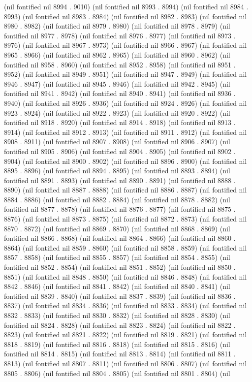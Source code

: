 {{(nil fontified nil 8994 . 9010) (nil fontified nil 8993 . 8994) (nil fontified nil 8984 . 8993) (nil fontified nil 8983 . 8984) (nil fontified nil 8982 . 8983) (nil fontified nil 8980 . 8982) (nil fontified nil 8979 . 8980) (nil fontified nil 8978 . 8979) (nil fontified nil 8977 . 8978) (nil fontified nil 8976 . 8977) (nil fontified nil 8973 . 8976) (nil fontified nil 8967 . 8973) (nil fontified nil 8966 . 8967) (nil fontified nil 8965 . 8966) (nil fontified nil 8962 . 8965) (nil fontified nil 8960 . 8962) (nil fontified nil 8958 . 8960) (nil fontified nil 8952 . 8958) (nil fontified nil 8951 . 8952) (nil fontified nil 8949 . 8951) (nil fontified nil 8947 . 8949) (nil fontified nil 8946 . 8947) (nil fontified nil 8945 . 8946) (nil fontified nil 8942 . 8945) (nil fontified nil 8941 . 8942) (nil fontified nil 8940 . 8941) (nil fontified nil 8936 . 8940) (nil fontified nil 8926 . 8936) (nil fontified nil 8924 . 8926) (nil fontified nil 8923 . 8924) (nil fontified nil 8922 . 8923) (nil fontified nil 8920 . 8922) (nil fontified nil 8918 . 8920) (nil fontified nil 8914 . 8918) (nil fontified nil 8913 . 8914) (nil fontified nil 8912 . 8913) (nil fontified nil 8911 . 8912) (nil fontified nil 8908 . 8911) (nil fontified nil 8907 . 8908) (nil fontified nil 8906 . 8907) (nil fontified nil 8905 . 8906) (nil fontified nil 8904 . 8905) (nil fontified nil 8902 . 8904) (nil fontified nil 8900 . 8902) (nil fontified nil 8896 . 8900) (nil fontified nil 8895 . 8896) (nil fontified nil 8894 . 8895) (nil fontified nil 8893 . 8894) (nil fontified nil 8891 . 8893) (nil fontified nil 8890 . 8891) (nil fontified nil 8888 . 8890) (nil fontified nil 8887 . 8888) (nil fontified nil 8886 . 8887) (nil fontified nil 8884 . 8886) (nil fontified nil 8882 . 8884) (nil fontified nil 8878 . 8882) (nil fontified nil 8877 . 8878) (nil fontified nil 8876 . 8877) (nil fontified nil 8875 . 8876) (nil fontified nil 8873 . 8875) (nil fontified nil 8872 . 8873) (nil fontified nil 8870 . 8872) (nil fontified nil 8869 . 8870) (nil fontified nil 8868 . 8869) (nil fontified nil 8866 . 8868) (nil fontified nil 8864 . 8866) (nil fontified nil 8860 . 8864) (nil fontified nil 8859 . 8860) (nil fontified nil 8858 . 8859) (nil fontified nil 8857 . 8858) (nil fontified nil 8855 . 8857) (nil fontified nil 8854 . 8855) (nil fontified nil 8852 . 8854) (nil fontified nil 8851 . 8852) (nil fontified nil 8850 . 8851) (nil fontified nil 8848 . 8850) (nil fontified nil 8846 . 8848) (nil fontified nil 8842 . 8846) (nil fontified nil 8841 . 8842) (nil fontified nil 8840 . 8841) (nil fontified nil 8839 . 8840) (nil fontified nil 8837 . 8839) (nil fontified nil 8836 . 8837) (nil fontified nil 8834 . 8836) (nil fontified nil 8833 . 8834) (nil fontified nil 8832 . 8833) (nil fontified nil 8830 . 8832) (nil fontified nil 8828 . 8830) (nil fontified nil 8824 . 8828) (nil fontified nil 8823 . 8824) (nil fontified nil 8822 . 8823) (nil fontified nil 8821 . 8822) (nil fontified nil 8819 . 8821) (nil fontified nil 8818 . 8819) (nil fontified nil 8816 . 8818) (nil fontified nil 8815 . 8816) (nil fontified nil 8814 . 8815) (nil fontified nil 8813 . 8814) (nil fontified nil 8811 . 8813) (nil fontified nil 8807 . 8811) (nil fontified nil 8806 . 8807) (nil fontified nil 8805 . 8806) (nil fontified nil 8804 . 8805) (nil fontified nil 8801 . 8804) (nil }}
